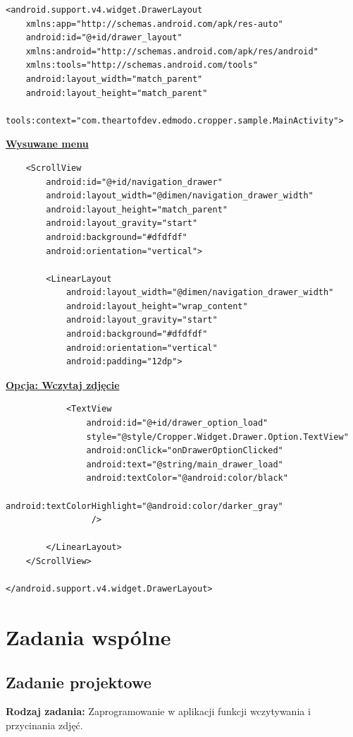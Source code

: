 \begin{verbatim}
<android.support.v4.widget.DrawerLayout
    xmlns:app="http://schemas.android.com/apk/res-auto"
    android:id="@+id/drawer_layout"
    xmlns:android="http://schemas.android.com/apk/res/android"
    xmlns:tools="http://schemas.android.com/tools"
    android:layout_width="match_parent"
    android:layout_height="match_parent"
    tools:context="com.theartofdev.edmodo.cropper.sample.MainActivity">
    \end{verbatim}
    \begin{center}
    \centering\underline{\textbf{Wysuwane menu}}
    \end{center}
    \begin{verbatim}
    <ScrollView
        android:id="@+id/navigation_drawer"
        android:layout_width="@dimen/navigation_drawer_width"
        android:layout_height="match_parent"
        android:layout_gravity="start"
        android:background="#dfdfdf"
        android:orientation="vertical">

        <LinearLayout
            android:layout_width="@dimen/navigation_drawer_width"
            android:layout_height="wrap_content"
            android:layout_gravity="start"
            android:background="#dfdfdf"
            android:orientation="vertical"
            android:padding="12dp">
\end{verbatim}
\begin{center}
\underline{\textbf{Opcja: Wczytaj zdjęcie}}
\end{center}
\begin{verbatim}
            <TextView
                android:id="@+id/drawer_option_load"
                style="@style/Cropper.Widget.Drawer.Option.TextView"
                android:onClick="onDrawerOptionClicked"
                android:text="@string/main_drawer_load"
                android:textColor="@android:color/black"
                android:textColorHighlight="@android:color/darker_gray"
                 />

        </LinearLayout>
    </ScrollView>

</android.support.v4.widget.DrawerLayout>

\end{verbatim}

\chapter{Zadania wspólne}

\section{Zadanie projektowe}
\noindent\textbf{Rodzaj zadania:}  Zaprogramowanie w aplikacji funkcji wczytywania i przycinania zdjęć.\\

